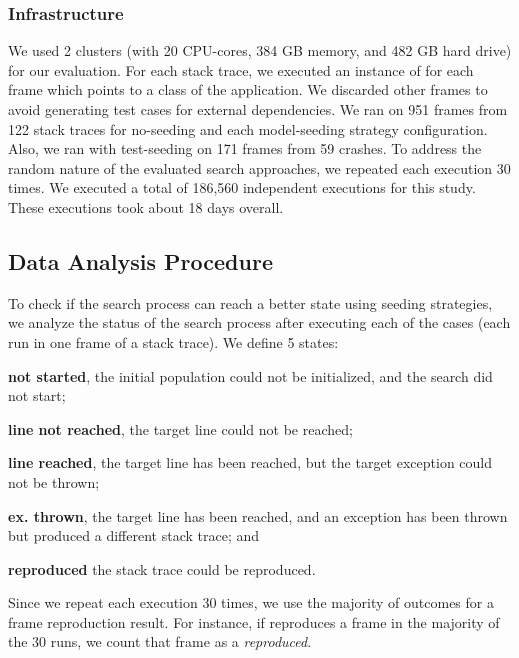 \subsubsection{Infrastructure}
\label{sec:setup:setup:infrst}
We used 2 clusters (with 20 CPU-cores, 384 GB memory, and 482 GB hard drive) for our evaluation. For each stack trace, we executed an instance of \botsing for each frame which points to a class of the application. We discarded other frames to avoid generating test cases for external dependencies. 
We ran \botsing on 951 frames from 122 stack traces for no-seeding and each model-seeding strategy configuration. Also, we ran \botsing with test-seeding on 171 frames from 59 crashes. To address the random nature of the evaluated search approaches, we repeated each execution 30 times.
We executed a total of 186,560 independent executions for this study. These executions took about 18 days overall.


\subsection{Data Analysis Procedure} 
\label{sec:setup:analyzing}

To check if the search process can reach a better state using seeding strategies, we analyze the status of the search process after executing each of the cases (each run in one frame of a stack trace). We define 5 states: %
% 
\begin{compactenum}[(i)]
\item \textbf{not started}, the initial population could not be initialized, and the search did not start;
\item \textbf{line not reached}, the target line could not be reached;
\item \textbf{line reached}, the target line has been reached, but the target exception could not be thrown;
\item \textbf{ex. thrown}, the target line has been reached, and an exception has been thrown but produced a different stack trace; and 
\item \textbf{reproduced} the stack trace could be reproduced.
\end{compactenum}
%
Since we repeat each execution 30 times, we use the majority of outcomes for a frame reproduction result. For instance, if \botsing reproduces a frame in the majority of the 30 runs, we count that frame as a \textit{reproduced}. 


